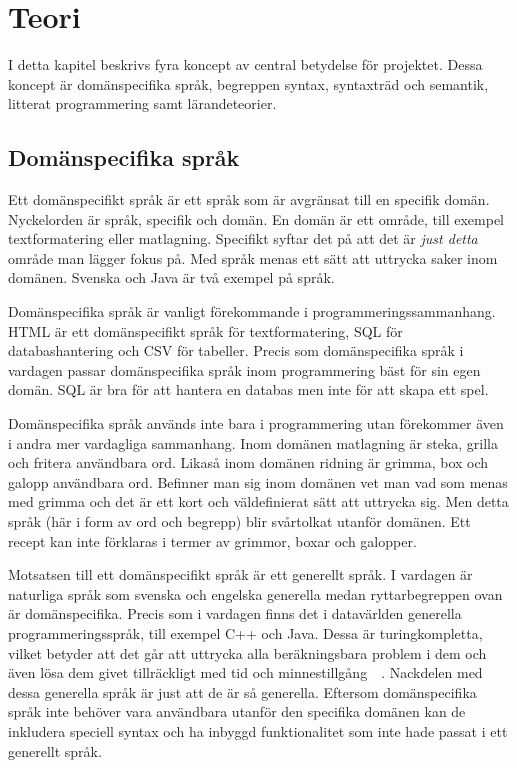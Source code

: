 
\chapter{Teori}

I detta kapitel beskrivs fyra koncept av central betydelse för projektet. Dessa
koncept är domänspecifika språk, begreppen syntax, syntaxträd och semantik,
litterat programmering samt lärandeteorier.

\section{Domänspecifika språk}

Ett domänspecifikt språk är ett språk som är avgränsat till en specifik domän.
Nyckelorden är språk, specifik och domän. En domän är ett område, till exempel
textformatering eller matlagning. Specifikt syftar det på att det är \textit{just
detta} område man lägger fokus på. Med språk menas ett sätt att uttrycka
saker inom domänen. Svenska och Java är två exempel på språk.

Domänspecifika språk är vanligt förekommande i programmeringssammanhang. HTML är
ett domänspecifikt språk för textformatering, SQL för databashantering och
CSV för tabeller. Precis som domänspecifika språk i vardagen passar
domänspecifika språk inom programmering bäst för sin egen domän. SQL är bra för
att hantera en databas men inte för att skapa ett spel.

Domänspecifika språk används inte bara i programmering utan förekommer även i
andra mer vardagliga sammanhang. Inom domänen matlagning är steka, grilla och
fritera användbara ord. Likaså inom domänen ridning är grimma, box och galopp
användbara ord. Befinner man sig inom domänen vet man vad som menas med grimma
och det är ett kort och väldefinierat sätt att uttrycka sig. Men detta språk (här
i form av ord och begrepp) blir svårtolkat utanför domänen. Ett recept kan inte
förklaras i termer av grimmor, boxar och galopper.

Motsatsen till ett domänspecifikt språk är ett generellt språk. I
vardagen är naturliga språk som svenska och engelska generella medan
ryttarbegreppen ovan är domänspecifika. Precis som i vardagen finns
det i datavärlden generella programmeringsspråk, till exempel C++ och
Java. Dessa är turingkompletta, vilket betyder att det går att
uttrycka alla beräkningsbara problem i dem och även lösa dem givet
tillräckligt med tid och
minnestillgång~\cite{turing_ne}~\cite{turing_book}. Nackdelen med
dessa generella språk är just att de är så generella. Eftersom
domänspecifika språk inte behöver vara användbara utanför den
specifika domänen kan de inkludera speciell syntax och ha inbyggd
funktionalitet som inte hade passat i ett generellt språk.

